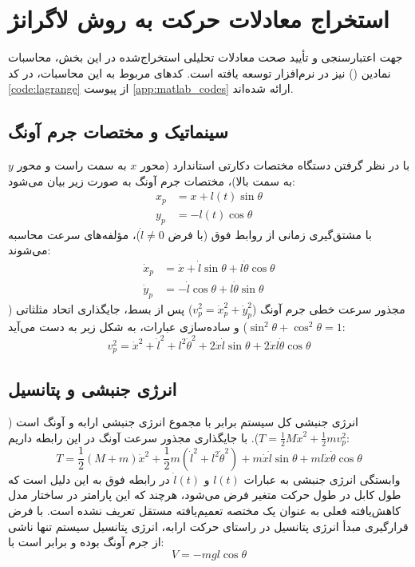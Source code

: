 \section{استخراج معادلات حرکت به روش لاگرانژ}

جهت اعتبارسنجی و تأیید صحت معادلات تحلیلی استخراج‌شده در این بخش، محاسبات نمادین () نیز در نرم‌افزار  توسعه یافته است. کدهای مربوط به این محاسبات، در کد \ref{code:lagrange} از پیوست \ref{app:matlab_codes} ارائه شده‌اند.

\subsection{سینماتیک و مختصات جرم آونگ}

با در نظر گرفتن دستگاه مختصات دکارتی استاندارد (محور $x$ به سمت راست و محور $y$ به سمت بالا)، مختصات جرم آونگ به صورت زیر بیان می‌شود:
\begin{align}
    x_p & = x + l(t) \sin\theta \\
    y_p & = -l(t) \cos\theta
\end{align}
با مشتق‌گیری زمانی از روابط فوق (با فرض $\dot{l} \neq 0$)، مؤلفه‌های سرعت محاسبه می‌شوند:
\begin{align}
    \dot{x}_p & = \dot{x} + \dot{l}\sin\theta + l\dot{\theta}\cos\theta \\
    \dot{y}_p & = -\dot{l}\cos\theta + l\dot{\theta}\sin\theta
\end{align}
مجذور سرعت خطی جرم آونگ ($v_p^2 = \dot{x}_p^2 + \dot{y}_p^2$) پس از بسط، جایگذاری اتحاد مثلثاتی ($\sin^2\theta + \cos^2\theta = 1$) و ساده‌سازی عبارات، به شکل زیر به دست می‌آید:
\begin{equation}
    v_p^2 = \dot{x}^2 + \dot{l}^2 + l^2\dot{\theta}^2 + 2\dot{x}\dot{l}\sin\theta + 2\dot{x}l\dot{\theta}\cos\theta
\end{equation}

\subsection{انرژی جنبشی و پتانسیل}

انرژی جنبشی کل سیستم برابر با مجموع انرژی جنبشی ارابه و آونگ است ($T = \frac{1}{2}M\dot{x}^2 + \frac{1}{2}m v_p^2$). با جایگذاری مجذور سرعت آونگ در این رابطه داریم:
\begin{equation}
    T = \frac{1}{2}(M+m)\dot{x}^2 + \frac{1}{2}m \left( \dot{l}^2 + l^2\dot{\theta}^2 \right) + m\dot{x}\dot{l}\sin\theta + ml\dot{x}\dot{\theta}\cos\theta
\end{equation}
وابستگی انرژی جنبشی به عبارات $l(t)$ و $\dot{l}(t)$ در رابطه فوق به این دلیل است که طول کابل در طول حرکت متغیر فرض می‌شود، هرچند که این پارامتر در ساختار مدل کاهش‌یافته فعلی به عنوان یک مختصه تعمیم‌یافته مستقل تعریف نشده است. با فرض قرارگیری مبدأ انرژی پتانسیل در راستای حرکت ارابه، انرژی پتانسیل سیستم تنها ناشی از جرم آونگ بوده و برابر است با:
\begin{equation}
    V = -mgl\cos\theta
\end{equation}

